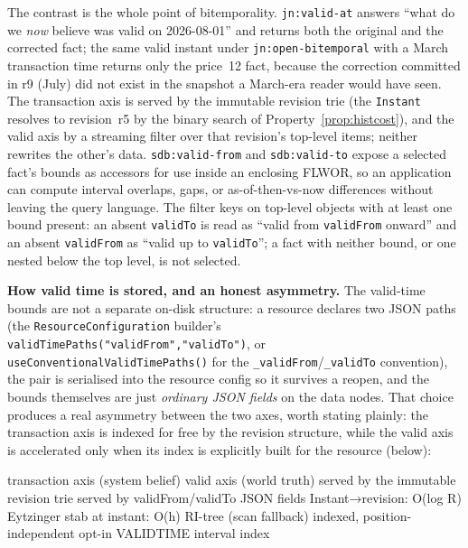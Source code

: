 \documentclass[11pt,a4paper,oneside]{report}
\newcommand{\dcap}[1]{\par\vspace{1pt}\noindent{\small\sffamily\bfseries\color{slate}#1}\par\vspace{-2pt}}
\theoremstyle{sirixthm}
\newcommand{\code}[1]{\texttt{#1}}
\begin{document}
The contrast is the whole point of bitemporality. \code{jn:valid-at} answers ``what do we \emph{now}
believe was valid on 2026-08-01'' and returns both the original and the corrected fact; the same valid
instant under \code{jn:open-bitemporal} with a March transaction time returns only the price~12 fact,
because the correction committed in r9 (July) did not exist in the snapshot a March-era reader would
have seen. The transaction axis is served by the immutable revision trie (the \code{Instant} resolves
to revision~r5 by the binary search of Property~\ref{prop:histcost}), and the valid axis by a streaming
filter over that revision's top-level items; neither rewrites the other's data. \code{sdb:valid-from}
and \code{sdb:valid-to} expose a selected fact's bounds as accessors for use inside an enclosing FLWOR,
so an application can compute interval overlaps, gaps, or as-of-then-vs-now differences without leaving
the query language. The filter keys on top-level objects with at least one bound present: an absent \code{validTo} is read
as ``valid from \code{validFrom} onward'' and an absent \code{validFrom} as ``valid up to \code{validTo}'';
a fact with neither bound, or one nested below the top level, is not selected.

\textbf{How valid time is stored, and an honest asymmetry.} The valid-time bounds are not a separate
on-disk structure: a resource declares two JSON paths
(the \code{ResourceConfiguration} builder's \code{validTimePaths("validFrom","validTo")}, or
\code{useConventionalValidTimePaths()} for the \code{\_validFrom}/\code{\_validTo} convention), the pair
is serialised into the resource config so it survives a reopen, and the bounds themselves are just
\emph{ordinary JSON fields} on the data nodes. That choice produces a real asymmetry between the two
axes, worth stating plainly: the transaction axis is indexed for free by the revision structure, while
the valid axis is accelerated only when its index is explicitly built for the resource (below):

\dcap{The two time axes have different cost shapes}
\begin{diagramS}
transaction axis (system belief)            valid axis (world truth)
  served by the immutable revision trie       served by validFrom/validTo JSON fields
  Instant→revision: O(log R) Eytzinger        stab at instant: O(h) RI-tree (scan fallback)
  indexed, position-independent               opt-in VALIDTIME interval index
\end{diagramS}
\end{document}
